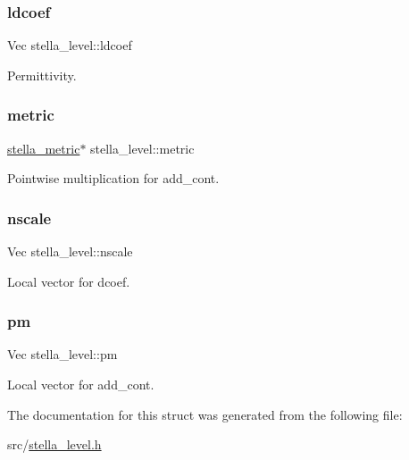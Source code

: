 \subsubsection{\texorpdfstring{ldcoef}{ldcoef}}
{\footnotesize\ttfamily Vec stella\+\_\+level\+::ldcoef}



Permittivity. 

\mbox{\label{structstella__level_a1f62922769745e8512f979a0ba07cb78}} 
\subsubsection{\texorpdfstring{metric}{metric}}
{\footnotesize\ttfamily \mbox{\hyperlink{structstella__metric}{stella\+\_\+metric}}$\ast$ stella\+\_\+level\+::metric}



Pointwise multiplication for add\+\_\+cont. 

\mbox{\label{structstella__level_ab071c1ffcf3f85e82f3074e7f19de16f}} 
\subsubsection{\texorpdfstring{nscale}{nscale}}
{\footnotesize\ttfamily Vec stella\+\_\+level\+::nscale}



Local vector for dcoef. 

\mbox{\label{structstella__level_a7d96ccadbcc7b34ba474a9c4780c30b6}} 
\subsubsection{\texorpdfstring{pm}{pm}}
{\footnotesize\ttfamily Vec stella\+\_\+level\+::pm}



Local vector for add\+\_\+cont. 



The documentation for this struct was generated from the following file\+:\begin{DoxyCompactItemize}
\item 
src/\mbox{\hyperlink{stella__level_8h}{stella\+\_\+level.\+h}}\end{DoxyCompactItemize}

